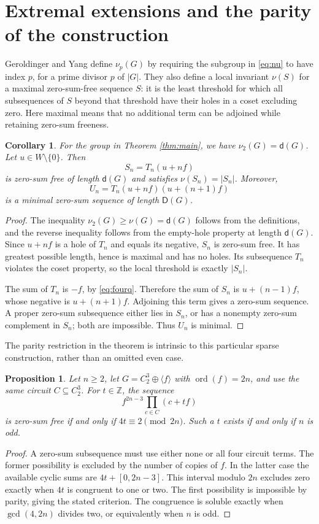 \documentclass[11pt]{article}
\newtheorem{proposition}[theorem]{Proposition}
\newtheorem{corollary}[theorem]{Corollary}
\theoremstyle{definition}
\newcommand{\D}{\mathsf D}
\newcommand{\dd}{\mathsf d}
\newcommand{\ord}{\operatorname{ord}}
\begin{document}
\section{Extremal extensions and the parity of the construction}

Geroldinger and Yang define $\nu_p(G)$ by requiring the subgroup in \eqref{eq:nu} to have index $p$, for a prime divisor $p$ of $|G|$. They also define a local invariant $\nu(S)$ for a maximal zero-sum-free sequence $S$: it is the least threshold for which all subsequences of $S$ beyond that threshold have their holes in a coset excluding zero. Here maximal means that no additional term can be adjoined while retaining zero-sum freeness.

\begin{corollary}\label{cor:local}
For the group in Theorem \ref{thm:main}, we have $\nu_2(G)=\dd(G)$. Let $u\in W\setminus\{0\}$. Then
\[
 S_n=T_n(u+nf)
\]
is zero-sum free of length $\dd(G)$ and satisfies $\nu(S_n)=|S_n|$. Moreover,
\[
 U_n=T_n(u+nf)(u+(n+1)f)
\]
is a minimal zero-sum sequence of length $\D(G)$.
\end{corollary}
\begin{proof}
The inequality $\nu_2(G)\geq\nu(G)=\dd(G)$ follows from the definitions, and the reverse inequality follows from the empty-hole property at length $\dd(G)$. Since $u+nf$ is a hole of $T_n$ and equals its negative, $S_n$ is zero-sum free. It has greatest possible length, hence is maximal and has no holes. Its subsequence $T_n$ violates the coset property, so the local threshold is exactly $|S_n|$.

The sum of $T_n$ is $-f$, by \eqref{eq:fourq}. Therefore the sum of $S_n$ is $u+(n-1)f$, whose negative is $u+(n+1)f$. Adjoining this term gives a zero-sum sequence. A proper zero-sum subsequence either lies in $S_n$, or has a nonempty zero-sum complement in $S_n$; both are impossible. Thus $U_n$ is minimal.
\end{proof}

The parity restriction in the theorem is intrinsic to this particular sparse construction, rather than an omitted even case.

\begin{proposition}\label{prop:parity}
Let $n\geq2$, let $G=C_2^3\oplus\langle f\rangle$ with $\ord(f)=2n$, and use the same circuit $C\subseteq C_2^3$. For $t\in\mathbb Z$, the sequence
\[
 f^{2n-3}\prod_{c\in C}(c+tf)
\]
is zero-sum free if and only if $4t\equiv2\pmod{2n}$. Such a $t$ exists if and only if $n$ is odd.
\end{proposition}
\begin{proof}
A zero-sum subsequence must use either none or all four circuit terms. The former possibility is excluded by the number of copies of $f$. In the latter case the available cyclic sums are $4t+[0,2n-3]$. This interval modulo $2n$ excludes zero exactly when $4t$ is congruent to one or two. The first possibility is impossible by parity, giving the stated criterion. The congruence is soluble exactly when $\gcd(4,2n)$ divides two, or equivalently when $n$ is odd.
\end{proof}
\end{document}
